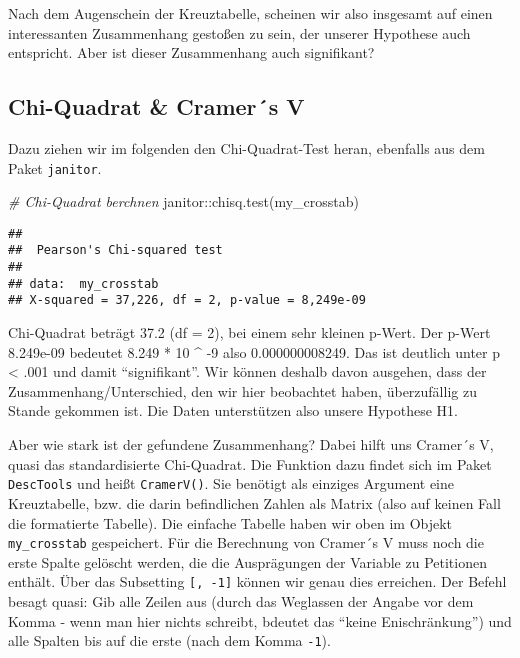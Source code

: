\documentclass[
]{book}
\newenvironment{Shaded}{\begin{snugshade}}{\end{snugshade}}
\newcommand{\CommentTok}[1]{\textcolor[rgb]{0.56,0.35,0.01}{\textit{#1}}}
\newcommand{\FunctionTok}[1]{\textcolor[rgb]{0.00,0.00,0.00}{#1}}
\newcommand{\NormalTok}[1]{#1}
\newcommand{\SpecialCharTok}[1]{\textcolor[rgb]{0.00,0.00,0.00}{#1}}
\begin{document}
Nach dem Augenschein der Kreuztabelle, scheinen wir also insgesamt auf einen interessanten Zusammenhang gestoßen zu sein, der unserer Hypothese auch entspricht. Aber ist dieser Zusammenhang auch signifikant?

\hypertarget{chi-quadrat-cramers-v}{%
\subsection{Chi-Quadrat \& Cramer´s V}\label{chi-quadrat-cramers-v}}

Dazu ziehen wir im folgenden den Chi-Quadrat-Test heran, ebenfalls aus dem Paket \texttt{janitor}.

\begin{Shaded}
\begin{Highlighting}[]
\CommentTok{\# Chi{-}Quadrat berchnen}
\NormalTok{janitor}\SpecialCharTok{::}\FunctionTok{chisq.test}\NormalTok{(my\_crosstab)}
\end{Highlighting}
\end{Shaded}

\begin{verbatim}
## 
##  Pearson's Chi-squared test
## 
## data:  my_crosstab
## X-squared = 37,226, df = 2, p-value = 8,249e-09
\end{verbatim}

Chi-Quadrat beträgt 37.2 (df = 2), bei einem sehr kleinen p-Wert. Der p-Wert 8.249e-09 bedeutet 8.249 * 10 \^{} -9 also 0.000000008249. Das ist deutlich unter p \textless{} .001 und damit ``signifikant''. Wir können deshalb davon ausgehen, dass der Zusammenhang/Unterschied, den wir hier beobachtet haben, überzufällig zu Stande gekommen ist. Die Daten unterstützen also unsere Hypothese H1.

Aber wie stark ist der gefundene Zusammenhang? Dabei hilft uns Cramer´s V, quasi das standardisierte Chi-Quadrat. Die Funktion dazu findet sich im Paket \texttt{DescTools} und heißt \texttt{CramerV()}. Sie benötigt als einziges Argument eine Kreuztabelle, bzw. die darin befindlichen Zahlen als Matrix (also auf keinen Fall die formatierte Tabelle). Die einfache Tabelle haben wir oben im Objekt \texttt{my\_crosstab} gespeichert. Für die Berechnung von Cramer´s V muss noch die erste Spalte gelöscht werden, die die Ausprägungen der Variable zu Petitionen enthält. Über das Subsetting \texttt{{[},\ -1{]}} können wir genau dies erreichen. Der Befehl besagt quasi: Gib alle Zeilen aus (durch das Weglassen der Angabe vor dem Komma - wenn man hier nichts schreibt, bdeutet das ``keine Enischränkung'') und alle Spalten bis auf die erste (nach dem Komma \texttt{-1}).
\end{document}
